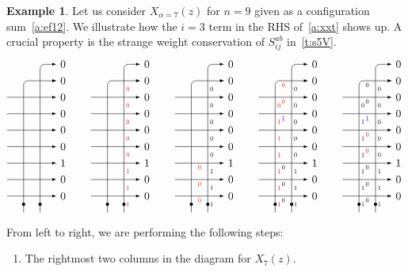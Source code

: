 \documentclass[11pt]{article}
\theoremstyle{definition}
\newtheorem{exam}[theo]{Example}
\numberwithin{equation}{section}
\begin{document}
\begin{exam}\label{a:ex:15}
Let us consider $X_{\alpha=7}(z)$ for $n=9$ given as a configuration sum~\eqref{a:ef12}. 
We illustrate how the $i=3$ term in the RHS of~\eqref{a:xxt} shows up.
A crucial property is the strange weight conservation of  $S^{ab}_{ij}$ in~\eqref{t:s5V}. 
\newcommand{\basepicture}[1]{
\begin{tikzpicture}[scale=.54,>=latex]
\draw[->,rounded corners] (0,-1) -- (0,7) -- (2,7) node[anchor=west] {$0$};
\draw[->,rounded corners] (1,-1) -- (1,8) -- (2,8) node[anchor=west] {$0$};
\foreach \y in {0,1,3,4,5,6}
	\draw[->] (-1,\y) -- (2,\y) node[anchor=west] {$0$};
\draw[->] (-1,2) -- (2,2) node[anchor=west] {$1$};
\fill[black] (0,-.5) circle (.1);
\fill[black] (1,-.5) circle (.1);
#1
\end{tikzpicture}
}
\[
\basepicture{}
%
\qquad
%
\basepicture{
\foreach \y in {3,4,...,7}
	\draw (1,\y-.5) node[color=red,anchor=west,scale=.6] {$0$};
\foreach \y in {0,1,2}
	\draw (1,\y-.5) node[color=red,anchor=west,scale=.6] {$1$};
}
%
\qquad
%
\basepicture{
\foreach \y in {3,4,...,7}
	\draw (1,\y-.5) node[anchor=west,scale=.6] {$0$};
\foreach \y in {0,1,2}
	\draw (1,\y-.5) node[anchor=west,scale=.6] {$1$};
\foreach \y in {0,1,2}
	\draw (.5,\y) node[color=red,anchor=north,scale=.6] {$0$};
}
%
\qquad
%
\basepicture{
\foreach \y in {3,4,...,7}
	\draw (1,\y-.5) node[anchor=west,scale=.6] {$0$};
\foreach \y in {0,1,2}
	\draw (1,\y-.5) node[anchor=west,scale=.6] {$1$};
\foreach \y in {0,1,2}
	\draw (.5,\y) node[anchor=north,scale=.6] {$0$};
\foreach \y in {0,1,...,5}
	\draw (0,\y-.5) node[color=red,anchor=west,scale=.6] {$1$};
\draw (0,5.5) node[color=red,anchor=west,scale=.6] {$0$};
\draw (.5,5) node[color=blue,anchor=north,scale=.6] {$\underline{1}$};
\draw (.5,6) node[color=red,anchor=north,scale=.6] {$0$};
\draw (.5,7) node[color=red,anchor=north,scale=.6] {$0$};
}
%
\qquad
%
\basepicture{
\foreach \y in {3,4,...,7}
	\draw (1,\y-.5) node[anchor=west,scale=.6] {$0$};
\foreach \y in {0,1,2}
	\draw (1,\y-.5) node[anchor=west,scale=.6] {$1$};
\foreach \y in {0,1,2,6,7}
	\draw (.5,\y) node[anchor=north,scale=.6] {$0$};
\foreach \y in {0,1,...,5}
	\draw (0,\y-.5) node[anchor=west,scale=.6] {$1$};
\draw (0,5.5) node[anchor=west,scale=.6] {$0$};
\draw (.5,5) node[color=blue,anchor=north,scale=.6] {$\underline{1}$};
\draw (.5,4) node[color=red,anchor=north,scale=.6] {$0$};
\draw (.5,3) node[color=red,anchor=north,scale=.6] {$0$};
}
\]
From left to right, we are performing the following steps:
\begin{enumerate}
\item The rightmost two columns in the diagram for $X_7(z)$.

\end{enumerate}
\end{exam}
\end{document}

